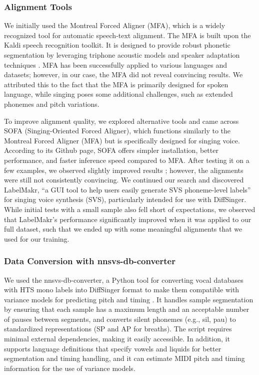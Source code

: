 \documentclass[a4paper]{article}
\begin{document}
\subsubsection*{Alignment Tools}
We initially used the Montreal Forced Aligner (MFA), which is a widely recognized tool for automatic speech-text alignment. The MFA is built upon the Kaldi speech recognition toolkit. It is designed to provide robust phonetic segmentation by leveraging triphone acoustic models and speaker adaptation techniques \cite{McAuliffe2017}. MFA has been successfully applied to various languages and datasets; however, in our case, the MFA did not reveal convincing results. We attributed this to the fact that the MFA is primarily designed for spoken language, while singing poses some additional challenges, such as extended phonemes and pitch variations.

To improve alignment quality, we explored alternative tools and came across SOFA (Singing-Oriented Forced Aligner), which functions similarly to the Montreal Forced Aligner (MFA) but is specifically designed for singing voice. According to its Github page, SOFA offers simpler installation, better performance, and faster inference speed compared to MFA. After testing it on a few examples, we observed slightly improved results \cite{Greenleaf2001}; however, the alignments were still not consistently convincing. We continued our search and discovered LabelMakr, “a GUI tool to help users easily generate SVS phoneme-level labels” \cite{spicytigermeat} for singing voice synthesis (SVS), particularly intended for use with DiffSinger. While initial tests with a small sample also fell short of expectations, we observed that LabelMakr's performance significantly improved when it was applied to our full dataset, such that we ended up with some meaningful alignments that we used for our training.

\subsubsection*{Data Conversion with nnsvs-db-converter}
We used the nnsvs-db-converter, a Python tool for converting vocal databases with HTS mono labels into DiffSinger format to make them compatible with variance models for predicting pitch and timing \cite{nnsvsdbconverter}. It handles sample segmentation by ensuring that each sample has a maximum length and an acceptable number of pauses between segments, and converts silent phonemes (e.g., sil, pau) to standardized representations (SP and AP for breaths). The script requires minimal external dependencies, making it easily accessible. In addition, it supports language definitions that specify vowels and liquids for better segmentation and timing handling, and it can estimate MIDI pitch and timing information for the use of variance models.
\end{document}
